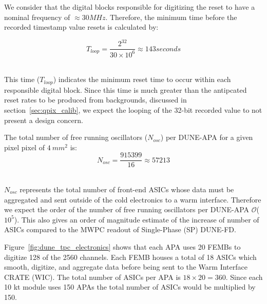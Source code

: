 We consider that the digital blocks responsible for digitizing the reset to have a nominal frequency of $\approx 30 MHz$.
Therefore, the minimum time before the recorded timestamp value resets is calculated by:

\begin{equation}
T_{loop} = \frac{2^{32}}{30\times 10^{6}} \approx 143 seconds
\end{equation}~\label{eq:tloop}

This time ($T_{loop}$) indicates the minimum reset time to occur within each responsible digital block.
Since this time is much greater than the antipcated reset rates to be produced from backgrounds, discussed in section~\ref{sec:qpix_calib}, we expect the looping of the 32-bit recorded value to not present a design concern.

The total number of free running oscillators ($N_{osc}$) per DUNE-APA for a given pixel pixel of $4~mm^{2}$ is:
\begin{equation}
N_{osc} = \frac{915399}{16} \approx 57213
\end{equation}~\label{eq:nosc}

$N_{osc}$ represents the total number of front-end ASICs whose data must be aggregated and sent outside of the cold electronics to a warm interface.
Therefore we expect the order of the number of free running oscillators per DUNE-APA $\mathcal{O}$($10^5$).
This also gives an order of magnitude estimate of the increase of number of ASICs compared to the MWPC readout of Single-Phase (SP) DUNE-FD.

Figure~\ref{fig:dune_tpc_electronics} shows that each APA uses 20 FEMBs to digitize 128 of the 2560 channels.
Each FEMB houses a total of 18 ASICs which smooth, digitize, and aggregate data before being sent to the Warm Interface CRATE (WIC).
The total number of ASICs per APA is $18\times 20 = 360$.
Since each 10 kt module uses 150 APAs the total number of ASICs would be multiplied by 150.

